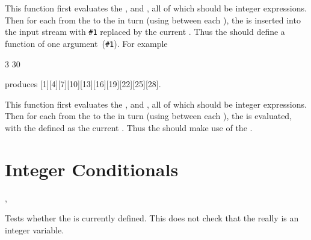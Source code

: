 \documentclass[oneside]{book}
\begin{document}
\begin{function}{\IntStepInline}
\begin{syntax}
    
\end{syntax}
This function first evaluates the , 
and , all of which should be integer expressions.
Then for each  from the  to the
 in turn (using  between each
), the  is inserted into the input stream
with \verb|#1| replaced by the current . Thus the
 should define a function of one argument~(\verb|#1|).
For example
\begin{codehigh}
\IgnoreSpacesOn
\TlClear \lTmpaTl
{} {3} {30} {
  \TlPutRight \lTmpaTl {[#1]}
}
\Result {\Value\lTmpaTl}
\IgnoreSpacesOff
\end{codehigh}
produces [1][4][7][10][13][16][19][22][25][28].
\end{function}

\begin{function}{\IntStepVariable}
\begin{syntax}
     
\end{syntax}
This function first evaluates the , 
and , all of which should be integer expressions.
Then for each  from the  to the
 in turn (using  between each
), the  is evaluated,
with the  defined as the current . Thus
the  should make use of the .
\end{function}

\section{Integer Conditionals}

\begin{function}{\IntIfExist, \IntIfExistTF}
\begin{syntax}
 
   
\end{syntax}
Tests whether the  is currently defined.  This does not
check that the  really is an integer variable.
\end{function}
\end{document}
